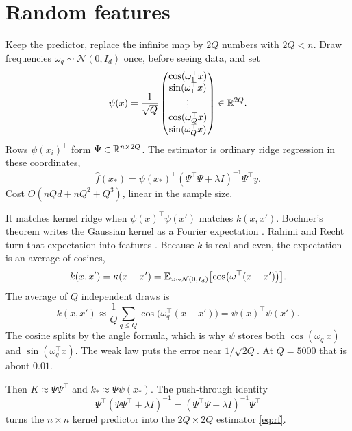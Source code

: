 \section{Random features}
\label{sec:rf}

Keep the predictor, replace the infinite map by \(2Q\) numbers with \(2Q<n\).
Draw frequencies \(\omega_q\sim\mathcal{N}(0,I_d)\) once, before seeing data, and set
\begin{equation}
\psi(x)
= \frac1{\sqrt Q}
\begin{pmatrix}
\cos(\omega_1^\top x) \\
\sin(\omega_1^\top x) \\
\vdots \\
\cos(\omega_Q^\top x) \\
\sin(\omega_Q^\top x)
\end{pmatrix}
\in\mathbb{R}^{2Q}.
\label{eq:psi}
\end{equation}
Rows \(\psi(x_i)^\top\) form \(\Psi\in\mathbb{R}^{n\times 2Q}\). The estimator is ordinary ridge regression in these coordinates,
\begin{equation}
\hat f(x_*)
= \psi(x_*)^\top(\Psi^\top\Psi+\lambda I)^{-1}\Psi^\top y.
\label{eq:rf}
\end{equation}
Cost \(O(nQd+nQ^2+Q^3)\), linear in the sample size.

It matches kernel ridge when \(\psi(x)^\top\psi(x')\) matches \(k(x,x')\).
Bochner's theorem writes the Gaussian kernel as a Fourier expectation \cite{bochner1933,rudin1962}.
Rahimi and Recht turn that expectation into features \cite{rahimi2007}.
Because \(k\) is real and even, the expectation is an average of cosines,
\begin{equation}
k(x,x')
= \kappa(x-x')
= \mathbb{E}_{\omega\sim\mathcal{N}(0,I_d)}
\bigl[\cos\bigl(\omega^\top(x-x')\bigr)\bigr].
\label{eq:bochner}
\end{equation}
The average of \(Q\) independent draws is
\begin{equation}
k(x,x')
\approx \frac1Q\sum_{q\le Q}\cos\bigl(\omega_q^\top(x-x')\bigr)
= \psi(x)^\top\psi(x').
\label{eq:lln}
\end{equation}
The cosine splits by the angle formula, which is why \(\psi\) stores both \(\cos(\omega_q^\top x)\) and \(\sin(\omega_q^\top x)\).
The weak law puts the error near \(1/\sqrt{2Q}\). At \(Q=5000\) that is about \(0.01\).

Then \(K\approx\Psi\Psi^\top\) and \(k_*\approx\Psi\psi(x_*)\).
The push-through identity
\begin{equation}
\Psi^\top(\Psi\Psi^\top+\lambda I)^{-1}
= (\Psi^\top\Psi+\lambda I)^{-1}\Psi^\top
\label{eq:push}
\end{equation}
turns the \(n\times n\) kernel predictor into the \(2Q\times 2Q\) estimator \eqref{eq:rf}.

